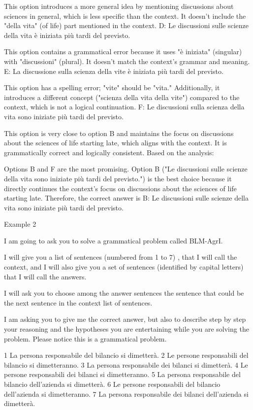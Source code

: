 This option introduces a more general idea by mentioning discussions about sciences in general, which is less specific than the context. It doesn't include the "della vita" (of life) part mentioned in the context.
D: Le discussioni sulle scienze della vita è iniziata più tardi del previsto.

This option contains a grammatical error because it uses "è iniziata" (singular) with "discussioni" (plural). It doesn't match the context's grammar and meaning.
E: La discussione sulla scienza della vite è iniziata più tardi del previsto.

This option has a spelling error; "vite" should be "vita." Additionally, it introduces a different concept ("scienza della vita della vite") compared to the context, which is not a logical continuation.
F: Le discussioni sulla scienza della vita sono iniziate più tardi del previsto.

This option is very close to option B and maintains the focus on discussions about the sciences of life starting late, which aligns with the context. It is grammatically correct and logically consistent.
Based on the analysis:

Options B and F are the most promising.
Option B ("Le discussioni sulle scienze della vita sono iniziate più tardi del previsto.") is the best choice because it directly continues the context's focus on discussions about the sciences of life starting late.
Therefore, the correct answer is B: Le discussioni sulle scienze della vita sono iniziate più tardi del previsto.

Example 2

I am going to ask you to solve a grammatical problem called BLM-AgrI.  

I will give you a list of sentences (numbered from 1 to 7) , that I will call the context, and I will also give you a set of sentences (identified by capital letters) that I will call  the answers. 

I will ask you to choose among the answer sentences the sentence that could be the next sentence in the context list of sentences.

I am asking you to give me the correct answer, but also to describe step by step  your reasoning and the hypotheses you are entertaining while you are solving the problem. Please notice this is a grammatical problem.


1 La persona responsabile del bilancio si dimetterà.
2 Le persone responsabili del bilancio si dimetteranno.
3 La persona responsabile dei bilanci si dimetterà.
4 Le persone responsabili dei bilanci si dimetteranno.
5 La persona responsabile del bilancio dell'azienda si dimetterà.
6 Le persone responsabili del bilancio dell'azienda si dimetteranno.
7 La persona responsabile dei bilanci dell'azienda si dimetterà.


